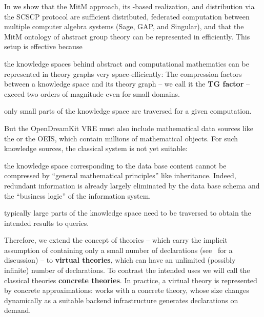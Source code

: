In \cite{KohMuePfe:kbimss17} we show that the MitM approach, its \ommt-based realization,
and distribution via the SCSCP protocol are sufficient distributed, federated computation
between multiple computer algebra systems (Sage, GAP, and Singular), and that the MitM
ontology of abstract group theory can be represented in \ommt efficiently. This setup is
effective because
\begin{compactenum}[\bf C1]
\item the knowledge spaces behind abstract and computational mathematics can be
  represented in theory graphs very space-efficiently: The compression factors between a
  knowledge space and its theory graph -- we call it the \textbf{TG factor} --
  exceed two orders of magnitude even for small domains.
\item only small parts of the knowledge space are traversed for a given computation. 
\end{compactenum}

But the OpenDreamKit VRE must also include mathematical data sources like the \lmfdb or
the OEIS, which contain millions of mathematical objects. For such knowledge sources, the
classical \mmt system is not yet suitable: 
\begin{compactenum}[\bf V1]
\item the knowledge space corresponding to the data base content cannot be compressed by
  ``general mathematical principles'' like inheritance. Indeed, redundant information is
  already largely eliminated by the data base schema and the ``business logic'' of the
  information system.
\item typically large parts of the knowledge space need to be traversed to obtain the
  intended results to queries.
\end{compactenum}
Therefore, we extend the concept of \ommt theories -- which carry the implicit
assumption of containing only a small number of declarations (see~\cite{FaGu:lt92} for a
discussion) -- to \textbf{virtual theories}, which can have an unlimited (possibly infinite) number of
declarations.
To contrast the intended
uses we will call the classical \ommt theories \textbf{concrete theories}. 
In practice, a virtual theory is represented by concrete approximations: \ommt works with a concrete theory, whose size changes dynamically as a suitable backend infrastructure generates declarations on demand.


